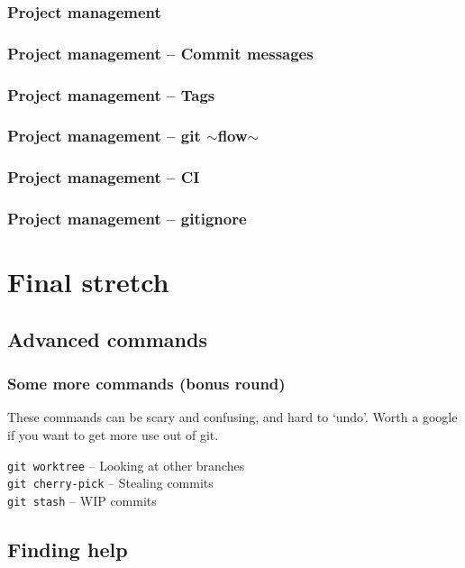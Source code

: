 \documentclass{beamer}
\begin{document}
\begin{frame}[fragile]
  \frametitle{Project management}
\end{frame}

\begin{frame}[fragile]
  \frametitle{Project management -- Commit messages}
\end{frame}

\begin{frame}[fragile]
  \frametitle{Project management -- Tags}
\end{frame}

\begin{frame}[fragile]
  \frametitle{Project management -- git $\sim$flow$\sim$}
\end{frame}

\begin{frame}[fragile]
  \frametitle{Project management -- CI} %
\end{frame}

\begin{frame}[fragile]
  \frametitle{Project management -- gitignore}
\end{frame}

\section{Final stretch}
\subsection{Advanced commands}

\begin{frame}[fragile]
  \frametitle{Some more commands (bonus round)}
  These commands can be scary and confusing, and hard to `undo'. Worth a google if you
  want to get more use out of git.
  \vspace{1em}
  
  \texttt{git worktree} -- Looking at other branches \\
  \texttt{git cherry-pick} -- Stealing commits \\
  \texttt{git stash} -- WIP commits \\
    
\end{frame}

\subsection{Finding help}
\end{document}
